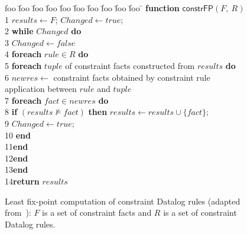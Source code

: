 \documentclass[conference]{llncs}
\begin{document}
{\begin{figure}[t]
\footnotesize
  \centering
    \begin{minipage}{.3\textwidth}
      \begin{tabbing}
        foo \= foo \= foo \= foo \= foo \= foo \= foo \= foo \= foo \= foo \= \kill
        \textbf{function} $\mathsf{constrFP}(F,~ R)$ \\
        1 \> $\mathit{results}\leftarrow F$;  $\mathit{Changed}\leftarrow \mathit{true}$; \\ 2\> \textbf{while} $\mathit{Changed}$ \textbf{do}\\
        3\>\> $\mathit{Changed}\leftarrow \mathit{false}$\\
        4\>\> \textbf{foreach} $\mathit{rule}\in R$ \textbf{do} \\ 
        5\>\>\> \textbf{foreach} $\mathit{tuple}$ of constraint facts constructed from $\mathit{results}$  \textbf{do}\\
        6\>\>\>\> $\mathit{newres} \leftarrow $ constraint facts obtained by constraint rule  \\
        \>\>\>\> \hspace{2.05cm} application between $\mathit{rule}$ and $\mathit{tuple}$ \\
        7\>\>\>\> \textbf{foreach} $\mathit{fact}\in \mathit{newres}$ \textbf{do} \\ 
        8\>\>\>\> \textbf{if} $(\mathit{results} \not\models \mathit{fact})$ \textbf{then} $\mathit{results} \leftarrow \mathit{results}\cup \{\mathit{fact}\};$\\ 
        9 \>\>\>\> $\mathit{Changed} \leftarrow \mathit{true};$\\
        10\>\>\>\> \textbf{end} \\
        11\>\>\>\textbf{end}\\
        12\>\>\textbf{end}\\
        13\>\textbf{end}\\
        14\>\textbf{return} $\mathit{results}$
      \end{tabbing}
    \end{minipage}
  \caption{\label{fig:fixpoint-comp}Least fix-point computation of
    constraint Datalog rules (adapted from~\cite{constraintdatalog}):
    $F$ is a set of {constraint facts} and $R$ is a set of {constraint
      Datalog rules.}}
\end{figure}


}
\end{document}

